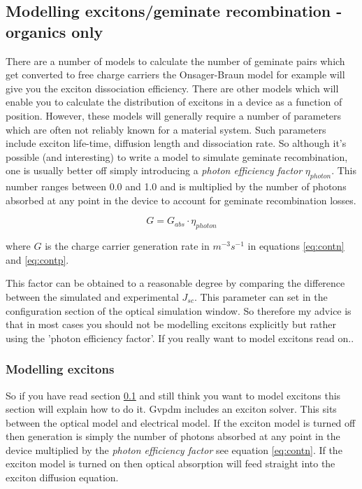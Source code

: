 
\subsection{Modelling excitons/geminate recombination - organics only}
\label{sec:dont_do_excitions}
There are a number of models to calculate the number of geminate pairs which get converted to free charge carriers the Onsager-Braun model for example will give you the exciton dissociation efficiency.  There are other models which will enable you to calculate the distribution of excitons in a device as a function of position.  However, these models will generally require a number of parameters which are often not reliably known for a material system. Such parameters include exciton life-time, diffusion length and dissociation rate. So although it's possible (and interesting) to write a model to simulate geminate recombination, one is usually better off simply introducing a \emph{photon efficiency factor} $\eta_{photon}$. This number ranges between 0.0 and 1.0 and is multiplied by the number of photons absorbed at any point in the device to account for geminate recombination losses.

\begin{equation}
\label{eq:contn}
G=G_{abs}\cdot \eta_{photon}
\end{equation}

where $G$ is the charge carrier generation rate in $m^{-3}s^{-1}$ in equations \ref{eq:contn} and  \ref{eq:contp}.
 
This factor can be obtained to a reasonable degree by comparing the difference between the simulated and experimental $J_{sc}$.  This parameter can set in the configuration section of the optical simulation window. So therefore my advice is that in most cases you should not be modelling excitons explicitly but rather using the 'photon efficiency factor'. If you really want to model excitons read on..

\subsubsection{Modelling excitons}
So if you have read section \ref{sec:dont_do_excitions} and still think you want to model excitons this section will explain how to do it.  Gvpdm includes an exciton solver. This sits between the optical model and electrical model.  If the exciton model is turned off then generation is simply the number of photons absorbed at any point in the device multiplied by the \emph{photon efficiency factor} see equation \ref{eq:contn}. If the exciton model is turned on then optical absorption will feed straight into the exciton diffusion equation.

